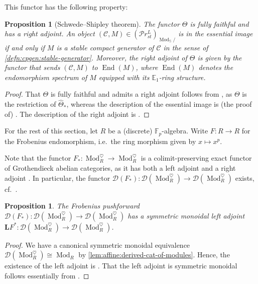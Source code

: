 \documentclass{article}
\theoremstyle{definition}
\theoremstyle{definition}
\theoremstyle{definition}
\theoremstyle{plain}
\theoremstyle{plain}
\theoremstyle{plain}
\theoremstyle{plain}
\theoremstyle{plain}
\theoremstyle{plain}
\newtheorem{prop}[defn]{Proposition}
\theoremstyle{plain}
\theoremstyle{plain}
\theoremstyle{remark}
\theoremstyle{remark}
\theoremstyle{plain}
\theoremstyle{plain}
\theoremstyle{plain}
\theoremstyle{plain}
\theoremstyle{plain}
\newcommand{\Fp}{\mathbb{F}_p}
\newcommand{\Mod}[1]{\operatorname{Mod}_{#1}}
\newcommand{\ModDisc}[1]{\operatorname{Mod}_{#1}^{\heartsuit}}
\newcommand{\End}[1]{\operatorname{End}(#1)}
\renewcommand{\S}{\mathbb{S}}
\newcommand{\Cat}[1]{\mathcal{#1}}
\newcommand{\PrSt}{\mathcal{P}r^{L}_{st}}
\begin{document}
This functor has the following property:
\begin{prop}[Schwede--Shipley theorem] \label{lem:affine:schwede-shipley}
    The functor $\Theta$ is fully faithful and has a right adjoint.
    An object $(\Cat C, M) \in {(\PrSt)}_{\Mod{\S}/}$ is in the essential image 
    if and only if $M$ is a stable compact generator of $\Cat C$ in the sense of \cref{defn:cpgen:stable-generator}.
    Moreover, the right adjoint of $\Theta$ is given by the functor
    that sends $(\Cat C, M)$ to $\End{M}$, 
    where $\End{M}$ denotes the endomorphism spectrum of $M$ equipped with its $\mathbb{E}_1$-ring structure.
\end{prop}
\begin{proof}
    That $\Theta$ is fully faithful and admits a right adjoint follows from \cite[Theorem 4.8.5.11]{higheralgebra},
    as $\Theta$ is the restriction of $\widehat{\Theta}_*$,
    whereas the description of the essential image is (the proof of) \cite[Theorem 7.1.2.1]{higheralgebra}.
    The description of the right adjoint is \cite[Remark 4.8.5.12]{higheralgebra}.
\end{proof}

For the rest of this section, let $R$ be a (discrete) $\Fp$-algebra.
Write $F \colon R \to R$ for the Frobenius endomorphism,
i.e.\ the ring morphism given by $x \mapsto x^p$.

Note that the functor $F_* \colon \ModDisc{R} \to \ModDisc{R}$ is a colimit-preserving 
exact functor of Grothendieck abelian categories, as it has both a left adjoint \cite[\href{https://stacks.math.columbia.edu/tag/05DQ}{Tag  05DQ}]{stacks-project} and a right adjoint \cite[\href{https://stacks.math.columbia.edu/tag/08YP}{Tag 08YP}]{stacks-project}.
In particular, the functor $\Cat D(F_*) \colon \Cat{D}(\ModDisc{R}) \to \Cat{D}(\ModDisc{R})$ 
exists, cf.\ \cite[Notation A.3]{cartmod}.

\begin{prop} \label{lem:affine:adjunction-on-module-cats}
    The Frobenius pushforward $\Cat D(F_*) \colon \Cat{D}(\ModDisc{R}) \to \Cat{D}(\ModDisc{R})$
    has a symmetric monoidal left adjoint $\mathbf{L}F^* \colon \Cat{D}(\ModDisc{R}) \to \Cat{D}(\ModDisc{R})$.
\end{prop}
\begin{proof}
    We have a canonical symmetric monoidal equivalence $\Cat{D}(\ModDisc{R}) \cong \Mod{R}$ by \cref{lem:affine:derived-cat-of-modules}.
    Hence, the existence of the left adjoint is \cite[Proposition 4.6.2.17]{higheralgebra}.
    That the left adjoint is symmetric monoidal follows essentially from \cite[Remark 4.5.3.2]{higheralgebra}.
\end{proof}
\end{document}
